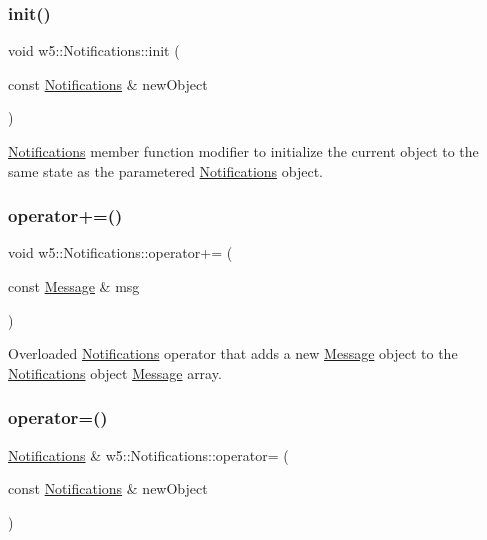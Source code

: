 \subsubsection{\texorpdfstring{init()}{init()}}
{\footnotesize\ttfamily void w5\+::\+Notifications\+::init (\begin{DoxyParamCaption}\item[{const \mbox{\hyperlink{classw5_1_1Notifications}{Notifications}} \&}]{new\+Object }\end{DoxyParamCaption})}

\mbox{\hyperlink{classw5_1_1Notifications}{Notifications}} member function modifier to initialize the current object to the same state as the parametered \mbox{\hyperlink{classw5_1_1Notifications}{Notifications}} object. \mbox{\label{classw5_1_1Notifications_ab6331b2dc2d9af68e462fdaecb74b43d}} 
\subsubsection{\texorpdfstring{operator+=()}{operator+=()}}
{\footnotesize\ttfamily void w5\+::\+Notifications\+::operator+= (\begin{DoxyParamCaption}\item[{const \mbox{\hyperlink{classw5_1_1Message}{Message}} \&}]{msg }\end{DoxyParamCaption})}

Overloaded \mbox{\hyperlink{classw5_1_1Notifications}{Notifications}} operator that adds a new \mbox{\hyperlink{classw5_1_1Message}{Message}} object to the \mbox{\hyperlink{classw5_1_1Notifications}{Notifications}} object \mbox{\hyperlink{classw5_1_1Message}{Message}} array. \mbox{\label{classw5_1_1Notifications_ae61c37a0a75bef883aede67cac203bd0}} 
\subsubsection{\texorpdfstring{operator=()}{operator=()}\hspace{0.1cm}{\footnotesize\ttfamily [1/2]}}
{\footnotesize\ttfamily \mbox{\hyperlink{classw5_1_1Notifications}{Notifications}} \& w5\+::\+Notifications\+::operator= (\begin{DoxyParamCaption}\item[{const \mbox{\hyperlink{classw5_1_1Notifications}{Notifications}} \&}]{new\+Object }\end{DoxyParamCaption})}

